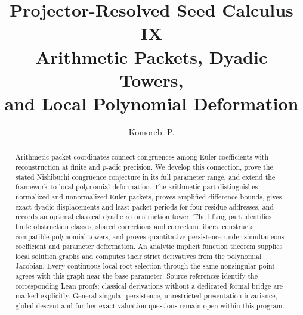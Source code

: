 \documentclass[11pt]{article}
\title{\textbf{Projector-Resolved Seed Calculus IX}\\[5pt]
  \Large Arithmetic Packets, Dyadic Towers,\\ and Local Polynomial Deformation}
\author{Komorebi P.}
\date{}
\theoremstyle{definition}
\theoremstyle{remark}
\numberwithin{equation}{section}
\begin{document}
\maketitle
\begin{abstract}
Arithmetic packet coordinates connect congruences among Euler coefficients
with reconstruction at finite and $p$-adic precision. We develop this
connection, prove the stated Nishibuchi congruence conjecture in its full
parameter range, and extend the framework to local polynomial deformation. The arithmetic part distinguishes normalized and unnormalized
Euler packets, proves amplified difference bounds, gives exact dyadic
displacements and least packet periods for four residue addresses, and records
an optimal classical dyadic reconstruction tower. The lifting part identifies
finite obstruction classes, shared corrections and correction fibers, constructs
compatible polynomial towers, and proves quantitative persistence under
simultaneous coefficient and parameter deformation. An analytic implicit
function theorem supplies local solution graphs and computes their strict
derivatives from the polynomial Jacobian. Every continuous local root
selection through the same nonsingular point agrees with this graph near
the base parameter. Source references identify the corresponding Lean proofs;
classical derivations without a dedicated formal bridge are marked explicitly. General singular
persistence, unrestricted presentation invariance, global descent and further
exact valuation questions remain open within this program.
\end{abstract}


\clearpage
{\small\setlength{\parskip}{0pt}\tableofcontents}
\clearpage






\end{document}
